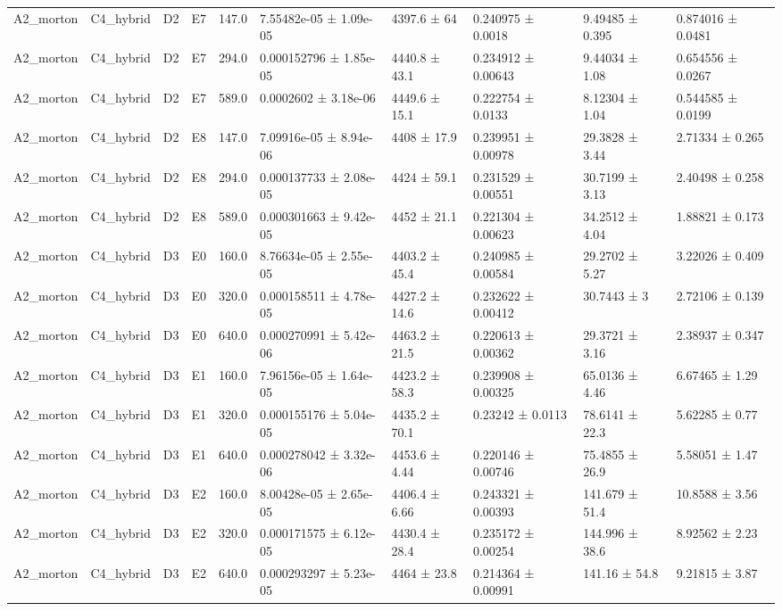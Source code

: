 \begin{table}
\begin{tabular}{llllllllll}
A2\_morton & C4\_hybrid & D2 & E7 & 147.0 & 7.55482e-05 ± 1.09e-05 & 4397.6 ± 64 & 0.240975 ± 0.0018 & 9.49485 ± 0.395 & 0.874016 ± 0.0481 \\
A2\_morton & C4\_hybrid & D2 & E7 & 294.0 & 0.000152796 ± 1.85e-05 & 4440.8 ± 43.1 & 0.234912 ± 0.00643 & 9.44034 ± 1.08 & 0.654556 ± 0.0267 \\
A2\_morton & C4\_hybrid & D2 & E7 & 589.0 & 0.0002602 ± 3.18e-06 & 4449.6 ± 15.1 & 0.222754 ± 0.0133 & 8.12304 ± 1.04 & 0.544585 ± 0.0199 \\
A2\_morton & C4\_hybrid & D2 & E8 & 147.0 & 7.09916e-05 ± 8.94e-06 & 4408 ± 17.9 & 0.239951 ± 0.00978 & 29.3828 ± 3.44 & 2.71334 ± 0.265 \\
A2\_morton & C4\_hybrid & D2 & E8 & 294.0 & 0.000137733 ± 2.08e-05 & 4424 ± 59.1 & 0.231529 ± 0.00551 & 30.7199 ± 3.13 & 2.40498 ± 0.258 \\
A2\_morton & C4\_hybrid & D2 & E8 & 589.0 & 0.000301663 ± 9.42e-05 & 4452 ± 21.1 & 0.221304 ± 0.00623 & 34.2512 ± 4.04 & 1.88821 ± 0.173 \\
A2\_morton & C4\_hybrid & D3 & E0 & 160.0 & 8.76634e-05 ± 2.55e-05 & 4403.2 ± 45.4 & 0.240985 ± 0.00584 & 29.2702 ± 5.27 & 3.22026 ± 0.409 \\
A2\_morton & C4\_hybrid & D3 & E0 & 320.0 & 0.000158511 ± 4.78e-05 & 4427.2 ± 14.6 & 0.232622 ± 0.00412 & 30.7443 ± 3 & 2.72106 ± 0.139 \\
A2\_morton & C4\_hybrid & D3 & E0 & 640.0 & 0.000270991 ± 5.42e-06 & 4463.2 ± 21.5 & 0.220613 ± 0.00362 & 29.3721 ± 3.16 & 2.38937 ± 0.347 \\
A2\_morton & C4\_hybrid & D3 & E1 & 160.0 & 7.96156e-05 ± 1.64e-05 & 4423.2 ± 58.3 & 0.239908 ± 0.00325 & 65.0136 ± 4.46 & 6.67465 ± 1.29 \\
A2\_morton & C4\_hybrid & D3 & E1 & 320.0 & 0.000155176 ± 5.04e-05 & 4435.2 ± 70.1 & 0.23242 ± 0.0113 & 78.6141 ± 22.3 & 5.62285 ± 0.77 \\
A2\_morton & C4\_hybrid & D3 & E1 & 640.0 & 0.000278042 ± 3.32e-06 & 4453.6 ± 4.44 & 0.220146 ± 0.00746 & 75.4855 ± 26.9 & 5.58051 ± 1.47 \\
A2\_morton & C4\_hybrid & D3 & E2 & 160.0 & 8.00428e-05 ± 2.65e-05 & 4406.4 ± 6.66 & 0.243321 ± 0.00393 & 141.679 ± 51.4 & 10.8588 ± 3.56 \\
A2\_morton & C4\_hybrid & D3 & E2 & 320.0 & 0.000171575 ± 6.12e-05 & 4430.4 ± 28.4 & 0.235172 ± 0.00254 & 144.996 ± 38.6 & 8.92562 ± 2.23 \\
A2\_morton & C4\_hybrid & D3 & E2 & 640.0 & 0.000293297 ± 5.23e-05 & 4464 ± 23.8 & 0.214364 ± 0.00991 & 141.16 ± 54.8 & 9.21815 ± 3.87 \\

\end{tabular}
\end{table}
